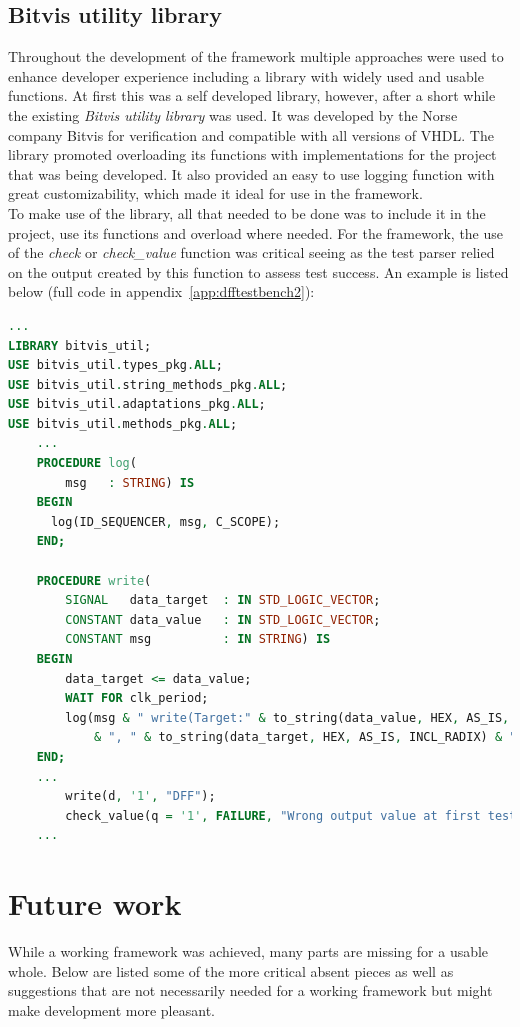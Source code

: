 \documentclass[11pt,british]{article}
\begin{document}
\subsection{Bitvis utility library}
\label{subsec:bitvis}
Throughout the development of the framework multiple approaches were used to enhance developer experience including a library with widely used and usable functions. At first this was a self developed library, however, after a short while the existing \emph{Bitvis utility library} was used. It was developed by the Norse company Bitvis for verification and compatible with all versions of \gls{VHDL}. \cite{bitvis} The library promoted overloading its functions with implementations for the project that was being developed. It also provided an easy to use logging function with great customizability, which made it ideal for use in the framework.
\\[\baselineskip]
To make use of the library, all that needed to be done was to include it in the project, use its functions and overload where needed. For the framework, the use of the \emph{check} or \emph{check\_value} function was critical seeing as the test parser relied on the output created by this function to assess test success. An example is listed below (full code in appendix~\ref{app:dfftestbench2}):
\begin{lstlisting}[language=VHDL, tabsize=4, frame=single, framesep=2mm, belowskip=8pt, aboveskip=8pt, showstringspaces=false, basicstyle=\footnotesize]
...
LIBRARY bitvis_util;
USE bitvis_util.types_pkg.ALL;
USE bitvis_util.string_methods_pkg.ALL;
USE bitvis_util.adaptations_pkg.ALL;
USE bitvis_util.methods_pkg.ALL;
	...
	PROCEDURE log(
    	msg   : STRING) IS
    BEGIN
      log(ID_SEQUENCER, msg, C_SCOPE);
    END;
    
	PROCEDURE write(
    	SIGNAL   data_target  : IN STD_LOGIC_VECTOR;
    	CONSTANT data_value   : IN STD_LOGIC_VECTOR;
    	CONSTANT msg          : IN STRING) IS
    BEGIN
    	data_target <= data_value;
    	WAIT FOR clk_period;
    	log(msg & " write(Target:" & to_string(data_value, HEX, AS_IS, INCL_RADIX) 
    		& ", " & to_string(data_target, HEX, AS_IS, INCL_RADIX) & ")";);
    END;
	...
		write(d, '1', "DFF");
		check_value(q = '1', FAILURE, "Wrong output value at first test");
	...
\end{lstlisting}


\newpage{}
\section{Future work}
While a working framework was achieved, many parts are missing for a usable whole. Below are listed some of the more critical absent pieces as well as suggestions that are not necessarily needed for a working framework but might make development more pleasant.
\end{document}
